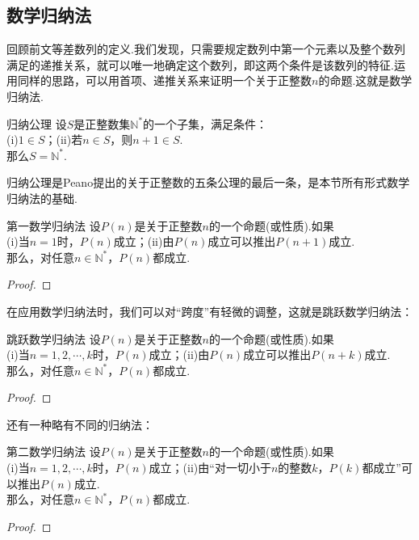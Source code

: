 \documentclass[lang=cn, zihao=4.5]{elegantbook}
\begin{document}
\subsection{数学归纳法}

回顾前文等差数列的定义.我们发现，只需要规定数列中第一个元素以及整个数列满足的递推关系，就可以唯一地确定这个数列，即这两个条件是该数列的特征.运用同样的思路，可以用首项、递推关系来证明一个关于正整数$n$的命题.这就是数学归纳法.

\begin{axiom}{归纳公理}
	设$S$是正整数集$\mathbb{N}^{*}$的一个子集，满足条件： \\
	(i)$1 \in S$；(ii)若$n \in S$，则$n+1 \in S$. \\
	那么$S = \mathbb{N}^{*}$.
\end{axiom}
\begin{remark}
	归纳公理是Peano提出的关于正整数的五条公理的最后一条，是本节所有形式数学归纳法的基础.
\end{remark}

\begin{theorem}{第一数学归纳法}
	设$P(n)$是关于正整数$n$的一个命题(或性质).如果 \\
	(i)当$n=1$时，$P(n)$成立；(ii)由$P(n)$成立可以推出$P(n+1)$成立. \\
	那么，对任意$n \in \mathbb{N}^{*}$，$P(n)$都成立.
\end{theorem}
\begin{proof}
\end{proof}

在应用数学归纳法时，我们可以对“跨度”有轻微的调整，这就是跳跃数学归纳法：

\begin{corollary}{跳跃数学归纳法}
	设$P(n)$是关于正整数$n$的一个命题(或性质).如果 \\
	(i)当$n=1,2, \cdots ,k$时，$P(n)$成立；(ii)由$P(n)$成立可以推出$P(n+k)$成立. \\
	那么，对任意$n \in \mathbb{N}^{*}$，$P(n)$都成立.
\end{corollary}
\begin{proof}
\end{proof}

还有一种略有不同的归纳法：

\begin{theorem}{第二数学归纳法}
	设$P(n)$是关于正整数$n$的一个命题(或性质).如果 \\
	(i)当$n=1,2, \cdots ,k$时，$P(n)$成立；(ii)由“对一切小于$n$的整数$k$，$P(k)$都成立”可以推出$P(n)$成立. \\
	那么，对任意$n \in \mathbb{N}^{*}$，$P(n)$都成立.
\end{theorem}
\begin{proof}
\end{proof}
\end{document}
